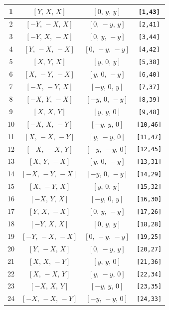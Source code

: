 \documentclass[fleqn,8pt]{jsarticle}
\begin{document}
\begin{longtable}{cccc}
1 & $\left[ Y,\, X,\, X \right]$ & $\left[ 0,\, y,\, y \right]$ & {\tt [1,43]} \\ \hline
2 & $\left[ - Y,\, - X,\, X \right]$ & $\left[ 0,\, - y,\, y \right]$ & {\tt [2,41]} \\ \hline
3 & $\left[ - Y,\, X,\, - X \right]$ & $\left[ 0,\, y,\, - y \right]$ & {\tt [3,44]} \\ \hline
4 & $\left[ Y,\, - X,\, - X \right]$ & $\left[ 0,\, - y,\, - y \right]$ & {\tt [4,42]} \\ \hline
5 & $\left[ X,\, Y,\, X \right]$ & $\left[ y,\, 0,\, y \right]$ & {\tt [5,38]} \\ \hline
6 & $\left[ X,\, - Y,\, - X \right]$ & $\left[ y,\, 0,\, - y \right]$ & {\tt [6,40]} \\ \hline
7 & $\left[ - X,\, - Y,\, X \right]$ & $\left[ - y,\, 0,\, y \right]$ & {\tt [7,37]} \\ \hline
8 & $\left[ - X,\, Y,\, - X \right]$ & $\left[ - y,\, 0,\, - y \right]$ & {\tt [8,39]} \\ \hline
9 & $\left[ X,\, X,\, Y \right]$ & $\left[ y,\, y,\, 0 \right]$ & {\tt [9,48]} \\ \hline
10 & $\left[ - X,\, X,\, - Y \right]$ & $\left[ - y,\, y,\, 0 \right]$ & {\tt [10,46]} \\ \hline
11 & $\left[ X,\, - X,\, - Y \right]$ & $\left[ y,\, - y,\, 0 \right]$ & {\tt [11,47]} \\ \hline
12 & $\left[ - X,\, - X,\, Y \right]$ & $\left[ - y,\, - y,\, 0 \right]$ & {\tt [12,45]} \\ \hline
13 & $\left[ X,\, Y,\, - X \right]$ & $\left[ y,\, 0,\, - y \right]$ & {\tt [13,31]} \\ \hline
14 & $\left[ - X,\, - Y,\, - X \right]$ & $\left[ - y,\, 0,\, - y \right]$ & {\tt [14,29]} \\ \hline
15 & $\left[ X,\, - Y,\, X \right]$ & $\left[ y,\, 0,\, y \right]$ & {\tt [15,32]} \\ \hline
16 & $\left[ - X,\, Y,\, X \right]$ & $\left[ - y,\, 0,\, y \right]$ & {\tt [16,30]} \\ \hline
17 & $\left[ Y,\, X,\, - X \right]$ & $\left[ 0,\, y,\, - y \right]$ & {\tt [17,26]} \\ \hline
18 & $\left[ - Y,\, X,\, X \right]$ & $\left[ 0,\, y,\, y \right]$ & {\tt [18,28]} \\ \hline
19 & $\left[ - Y,\, - X,\, - X \right]$ & $\left[ 0,\, - y,\, - y \right]$ & {\tt [19,25]} \\ \hline
20 & $\left[ Y,\, - X,\, X \right]$ & $\left[ 0,\, - y,\, y \right]$ & {\tt [20,27]} \\ \hline
21 & $\left[ X,\, X,\, - Y \right]$ & $\left[ y,\, y,\, 0 \right]$ & {\tt [21,36]} \\ \hline
22 & $\left[ X,\, - X,\, Y \right]$ & $\left[ y,\, - y,\, 0 \right]$ & {\tt [22,34]} \\ \hline
23 & $\left[ - X,\, X,\, Y \right]$ & $\left[ - y,\, y,\, 0 \right]$ & {\tt [23,35]} \\ \hline
24 & $\left[ - X,\, - X,\, - Y \right]$ & $\left[ - y,\, - y,\, 0 \right]$ & {\tt [24,33]} \\
\end{longtable}
\end{document}

